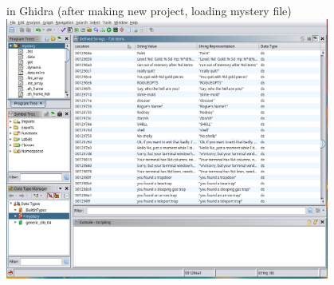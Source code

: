 

\begin{frame}{in Ghidra}
\small (after making new project, loading mystery file) \\
\includegraphics[width=0.8\textwidth]{../re-tools/ghidra-strings-mystery-ex}
\end{frame}

